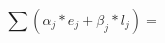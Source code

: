 \documentclass{minimal}
\begin{document}
\begin{equation}
\sum \left( \alpha_j * e_j + \beta_j * l_j \right) =
\end{equation}
\end{document}
